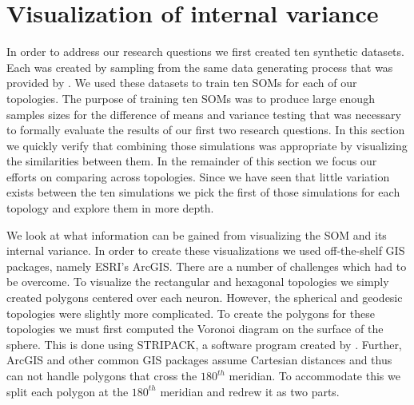 \section{Visualization of internal variance}
\label{rdq3}
In order to address our research questions we first created ten synthetic
datasets.  Each was created by sampling from the same data generating process
that was provided by \cite{wu2006}.  We used these datasets to train ten
SOMs for each of our topologies.  The purpose of training ten SOMs was to
produce large enough samples sizes for the difference of means and variance
testing that was necessary to formally evaluate the results of our first two
research questions.  In this section we quickly verify that combining those
simulations was appropriate by visualizing the similarities between them.
In the remainder of this section we focus our efforts on comparing across
topologies.  Since we have seen that little variation exists between the ten
simulations we pick the first of those simulations for each topology and
explore them in more depth.

We look at what information can be gained from visualizing the SOM and its
internal variance. In order to create these visualizations we used
off-the-shelf GIS packages, namely ESRI's ArcGIS.  There are a number of
challenges which had to be overcome. To visualize the rectangular and
hexagonal topologies we simply created polygons centered over each neuron.
However, the spherical and geodesic topologies were slightly more complicated.
To create the polygons for these topologies we must first computed the Voronoi
diagram on the surface of the sphere.  This is done using STRIPACK, a software
program created by \cite{Ranka97}.  Further, ArcGIS and other common GIS
packages assume Cartesian distances and thus can not handle polygons that
cross the $180^{th}$ meridian.  To accommodate this we split each polygon at
the $180^{th}$ meridian and redrew it as two parts.  

